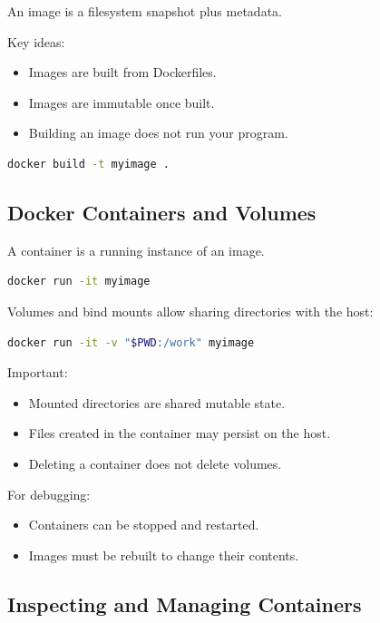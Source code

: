 \documentclass{../juni}
\begin{document}
An image is a filesystem snapshot plus metadata.

Key ideas:
\begin{itemize}
  \item Images are built from Dockerfiles.
  \item Images are immutable once built.
  \item Building an image does not run your program.
\end{itemize}

\begin{lstlisting}[language=bash]
docker build -t myimage .
\end{lstlisting}

\subsection{Docker Containers and Volumes}

A container is a running instance of an image.

\begin{lstlisting}[language=bash]
docker run -it myimage
\end{lstlisting}

Volumes and bind mounts allow sharing directories with the host:

\begin{lstlisting}[language=bash]
docker run -it -v "$PWD:/work" myimage
\end{lstlisting}

Important:
\begin{itemize}
  \item Mounted directories are shared mutable state.
  \item Files created in the container may persist on the host.
  \item Deleting a container does not delete volumes.
\end{itemize}

For debugging:
\begin{itemize}
  \item Containers can be stopped and restarted.
  \item Images must be rebuilt to change their contents.
\end{itemize}

\subsection{Inspecting and Managing Containers}
\end{document}
